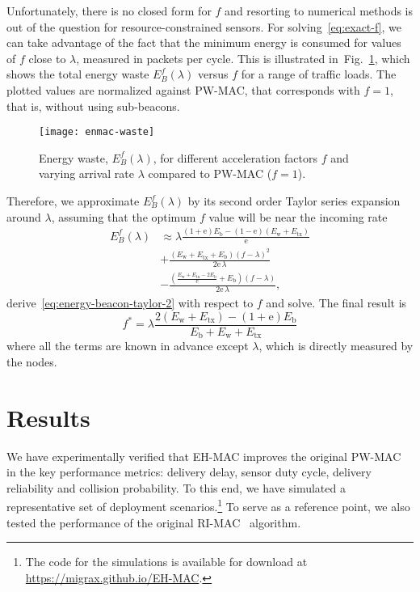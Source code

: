 \documentclass[journal,english,twocolumn,10pt,letterpaper]{IEEEtran}
\begin{document}
Unfortunately, there is no closed form for $f$ and resorting to numerical
methods is out of the question for resource-constrained sensors.
For solving~\eqref{eq:exact-f}, we can take advantage of the fact that the
minimum energy is consumed for values of $f$ close to $\lambda$, measured in
packets per cycle. This is illustrated in~Fig.~\ref{fig:profit}, which shows
the total energy waste $E_B^f(\lambda)$ versus $f$ for a range of traffic
loads. The plotted values are normalized against PW-MAC, that corresponds with
$f=1$, that is, without using sub-beacons.
\begin{figure}
  \centering
  \texttt{[image: enmac-waste]}
  \caption{Energy waste, $E_B^f(\lambda)$, for different acceleration factors
    $f$ and varying arrival rate $\lambda$ compared to PW-MAC ($f=1$).}
  \label{fig:profit}
\end{figure}
Therefore, we approximate $E_B^f(\lambda)$ by its second order Taylor series
expansion around $\lambda$, assuming that the optimum $f$ value will be near
the incoming rate
\begin{align}
  \label{eq:energy-beacon-taylor-2}
  E_B^f(\lambda) &\approx \lambda\frac{(1+\mathrm{e}) E_{\mathrm{b}} - (1-\mathrm{e}) (E_{\mathrm{w}} +
                    E_{\mathrm{tx}})}{\mathrm{e}}\nonumber\\
                  &+\frac{(E_{\mathrm{w}} + E_{\mathrm{tx}}+E_{\mathrm{b}})(f-\lambda)^2}{2\mathrm{e}\, \lambda}\nonumber\\
                  &-\frac{\left(\frac{E_{\mathrm{w}} +
                    E_{\mathrm{tx}}
                    -2 E_{\mathrm{b}}}{\mathrm{e}}+E_{\mathrm{b}}\right) (f-\lambda)}
                    {2\mathrm{e}\, \lambda},
\end{align}
derive~\eqref{eq:energy-beacon-taylor-2} with respect to $f$ and solve. The
final result is
\begin{equation}
  \label{eq:taylor-f-1}
f^\ast = \lambda\frac{2 (E_{\mathrm{w}} + E_{\mathrm{tx}}) - (1+\mathrm{e})E_{\mathrm{b}}}{E_{\mathrm{b}} + E_{\mathrm{w}} + E_{\mathrm{tx}}}
\end{equation}
where all the terms are known in advance except $\lambda$, which is directly
measured by the nodes.


\section{Results}
\label{sec:results}

We have experimentally verified that EH-MAC improves the
original PW-MAC in the key performance metrics: delivery delay, sensor duty
cycle, delivery reliability and collision probability. To this end, we have
simulated a representative set of deployment scenarios.\footnote{The code for
  the simulations is available for download at
  \url{https://migrax.github.io/EH-MAC}.} To serve as a reference point, we
also tested the performance of the original RI-MAC~\cite{sun08:_ri_mac}
algorithm.
\end{document}
